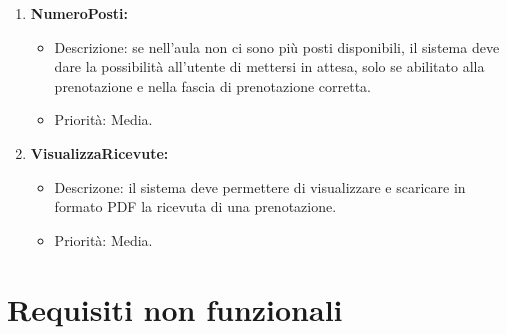 \begin{enumerate}
\item \textbf{NumeroPosti:}
\begin{itemize}
\item Descrizione: se nell'aula non ci sono più posti disponibili, il sistema deve dare la possibilità all'utente di mettersi in attesa, solo se abilitato alla prenotazione e nella fascia di prenotazione corretta.
\item	Priorità: Media.
\end{itemize}


\item \textbf{VisualizzaRicevute:}
\begin{itemize}
\item Descrizone: il sistema deve permettere di visualizzare e scaricare in formato PDF la ricevuta di una prenotazione.
\item	Priorità: Media.
\end{itemize}

\end{enumerate}	



\section{Requisiti non funzionali}

